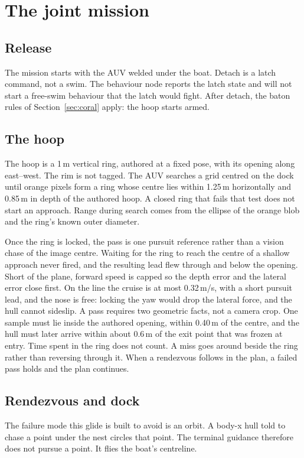 \documentclass[conference]{IEEEtran}
\begin{document}
\section{The joint mission}
\label{sec:mission}

\subsection{Release}
The mission starts with the AUV welded under the boat. Detach is a latch command, not a swim. The behaviour node reports the latch state and will not start a free-swim behaviour that the latch would fight. After detach, the baton rules of Section~\ref{sec:coral} apply: the hoop starts armed.

\subsection{The hoop}
The hoop is a 1\,m vertical ring, authored at a fixed pose, with its opening along east--west. The rim is not tagged. The AUV searches a grid centred on the dock until orange pixels form a ring whose centre lies within 1.25\,m horizontally and 0.85\,m in depth of the authored hoop. A closed ring that fails that test does not start an approach. Range during search comes from the ellipse of the orange blob and the ring's known outer diameter.

Once the ring is locked, the pass is one pursuit reference rather than a vision chase of the image centre. Waiting for the ring to reach the centre of a shallow approach never fired, and the resulting lead flew through and below the opening. Short of the plane, forward speed is capped so the depth error and the lateral error close first. On the line the cruise is at most 0.32\,m/s, with a short pursuit lead, and the nose is free: locking the yaw would drop the lateral force, and the hull cannot sideslip. A pass requires two geometric facts, not a camera crop. One sample must lie inside the authored opening, within 0.40\,m of the centre, and the hull must later arrive within about 0.6\,m of the exit point that was frozen at entry. Time spent in the ring does not count. A miss goes around beside the ring rather than reversing through it. When a rendezvous follows in the plan, a failed pass holds and the plan continues.

\subsection{Rendezvous and dock}
The failure mode this glide is built to avoid is an orbit. A body-x hull told to chase a point under the nest circles that point. The terminal guidance therefore does not pursue a point. It flies the boat's centreline.
\end{document}
